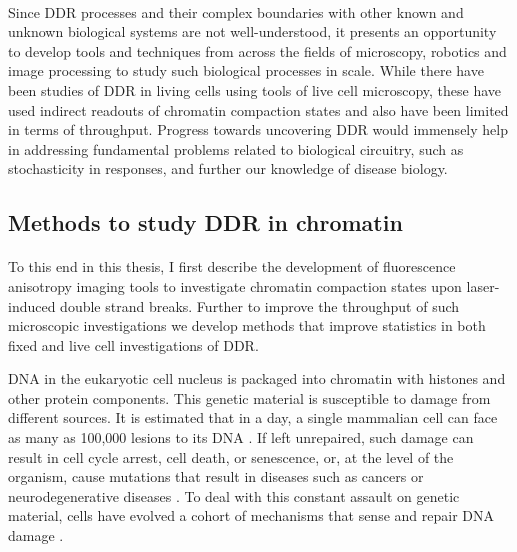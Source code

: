 \paragraph*{} Since DDR processes and their complex boundaries with other known and unknown biological systems are not well-understood, it presents an opportunity to develop tools and techniques from across the fields of microscopy, robotics and image processing to study such biological processes in scale. While there have been studies of DDR in living cells using tools of live cell microscopy, these have used indirect readouts of chromatin compaction states and also have been limited in terms of throughput. Progress towards uncovering DDR would immensely help in addressing fundamental problems related to biological circuitry, such as stochasticity in responses, and further our knowledge of disease biology.

\subsection{Methods to study DDR in chromatin}
\paragraph*{} To this end in this thesis, I first describe the development of fluorescence anisotropy imaging tools to investigate chromatin compaction states upon laser-induced double strand breaks. Further to improve the throughput of such microscopic investigations we develop methods that improve statistics in both fixed and live cell investigations of DDR.



DNA in the eukaryotic cell nucleus is packaged into chromatin with histones and other protein components. This genetic material is susceptible to damage from different sources. It is estimated that in a day, a single mammalian cell can face as many as 100,000 lesions to its DNA \cite{ciccia2010dna}. If left unrepaired, such damage can result in cell cycle arrest, cell death, or senescence, or, at the level of the organism, cause mutations that result in diseases such as cancers or neurodegenerative diseases \cite{friedberg2005dna, madabhushi2014dna}. To deal with this constant assault on genetic material, cells have evolved a cohort of mechanisms that sense and repair DNA damage \cite{hoeijmakers2009dna}.

